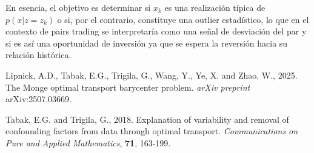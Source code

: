 \documentclass{myarticle}
\begin{document}
En esencia, el objetivo es determinar si \( x_k \) es una realización típica de \( p(x | z = z_k) \) o si, por el contrario, constituye una outlier estadístico, lo que en el contexto de pairs trading se interpretaría como una señal de desviación del par y si es as\'i una oportunidad de inversi\'on ya que se espera la reversión hacia su relaci\'on hist\'orica.

\vskip 1cm

\vskip 0.3cm

\small
\noindent Lipnick, A.D., Tabak, E.G., Trigila, G., Wang, Y., Ye, X. and Zhao, W., 2025. The Monge optimal transport barycenter problem. {\em arXiv preprint} arXiv:2507.03669.
\vskip 0.1cm

\noindent Tabak, E.G. and Trigila, G., 2018. Explanation of variability and removal of confounding factors from data through optimal transport. {\em Communications on Pure and Applied Mathematics}, {\bf 71}, 163-199.
%
%
%
%
%
%
%
%
%
%
\end{document}
